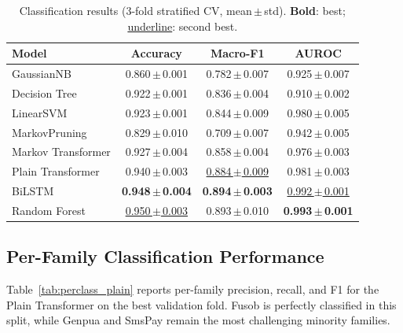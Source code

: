 \documentclass[12pt]{report}
\begin{document}
\begin{table}[t]
\centering
\caption{Classification results (3-fold stratified CV, mean\,$\pm$\,std).
  \textbf{Bold}: best; \underline{underline}: second best.}
\label{tab:classification}
\begin{tabular}{lccc}
\toprule
\textbf{Model} & \textbf{Accuracy} & \textbf{Macro-F1} & \textbf{AUROC} \\
\midrule
GaussianNB          & 0.860\,$\pm$\,0.001 & 0.782\,$\pm$\,0.007 & 0.925\,$\pm$\,0.007 \\
Decision Tree       & 0.922\,$\pm$\,0.001 & 0.836\,$\pm$\,0.004 & 0.910\,$\pm$\,0.002 \\
LinearSVM           & 0.923\,$\pm$\,0.001 & 0.844\,$\pm$\,0.009 & 0.980\,$\pm$\,0.005 \\
MarkovPruning       & 0.829\,$\pm$\,0.010 & 0.709\,$\pm$\,0.007 & 0.942\,$\pm$\,0.005 \\
Markov Transformer  & 0.927\,$\pm$\,0.004 & 0.858\,$\pm$\,0.004 & 0.976\,$\pm$\,0.003 \\
Plain Transformer   & 0.940\,$\pm$\,0.003 & \underline{0.884\,$\pm$\,0.009} & 0.981\,$\pm$\,0.003 \\
BiLSTM              & \textbf{0.948\,$\pm$\,0.004} & \textbf{0.894\,$\pm$\,0.003} & \underline{0.992\,$\pm$\,0.001} \\
Random Forest       & \underline{0.950\,$\pm$\,0.003} & 0.893\,$\pm$\,0.010 & \textbf{0.993\,$\pm$\,0.001} \\
\bottomrule
\end{tabular}
\end{table}

\subsection{Per-Family Classification Performance}
Table~\ref{tab:perclass_plain} reports per-family precision, recall, and
F1 for the Plain Transformer on the best validation fold. Fusob is
perfectly classified in this split, while Genpua and SmsPay remain the
most challenging minority families.
\end{document}
